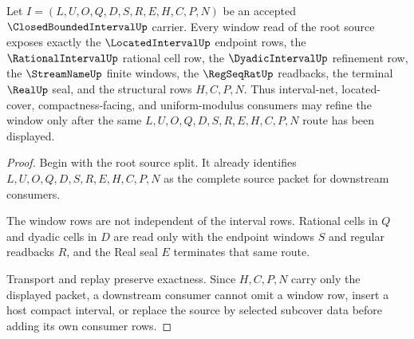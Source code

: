 \begin{theorem}
\label{thm:closed-bounded-interval-root-source-window-exactness}
Let $I=(L,U,O,Q,D,S,R,E,H,C,P,N)$ be an accepted $\ClosedBoundedIntervalUp$ carrier. Every window read of the root source exposes exactly the $\LocatedIntervalUp$ endpoint rows, the $\RationalIntervalUp$ rational cell row, the $\DyadicIntervalUp$ refinement row, the $\StreamNameUp$ finite windows, the $\RegSeqRatUp$ readbacks, the terminal $\RealUp$ seal, and the structural rows $H,C,P,N$. Thus interval-net, located-cover, compactness-facing, and uniform-modulus consumers may refine the window only after the same $L,U,O,Q,D,S,R,E,H,C,P,N$ route has been displayed.
\end{theorem}
\begin{proof}
Begin with the root source split. It already identifies $L,U,O,Q,D,S,R,E,H,C,P,N$ as the complete source packet for downstream consumers.

The window rows are not independent of the interval rows. Rational cells in $Q$ and dyadic cells in $D$ are read only with the endpoint windows $S$ and regular readbacks $R$, and the Real seal $E$ terminates that same route.

Transport and replay preserve exactness. Since $H,C,P,N$ carry only the displayed packet, a downstream consumer cannot omit a window row, insert a host compact interval, or replace the source by selected subcover data before adding its own consumer rows.
\end{proof}

